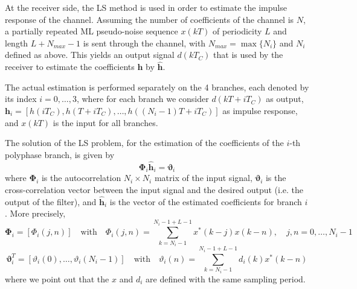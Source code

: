 \documentclass[10pt]{article}
\begin{document}
At the receiver side, the LS method is used in order to estimate the impulse response of the channel. Assuming the number of coefficients of the channel is $N$, a partially repeated ML pseudo-noise sequence $x(kT)$ of periodicity $L$ and length $L + N_{max} - 1$ is sent through the channel, with $N_{max} = \max \{N_i\}$ and $N_i$ defined as above.
This yields an output signal $d(kT_C)$ that is used by the receiver to estimate the coefficients $\mathbf{h}$ by $\mathbf{\hat{h}}$.

The actual estimation is performed separately on the 4 branches, each denoted by its index $i = 0,\ldots,3$, where for each branch we consider $d(kT+iT_C)$ as output, $\mathbf{h}_i = [h(iT_C), h(T+iT_C), \ldots, h((N_i-1)T + iT_C)]$ as impulse response, and $x(kT)$ is the input for all branches.

The solution of the LS problem, for the estimation of the coefficients of the $i$-th polyphase branch, is given by
\begin{equation}
	\mathbf{\Phi}_i \mathbf{\hat{h}}_i = \boldsymbol\vartheta_i
\end{equation}
where $\mathbf{\Phi}_i$ is the autocorrelation $N_i \times N_i$ matrix of the input signal, $ \boldsymbol\vartheta_i$ is the cross-correlation vector between the input signal and the desired output (i.e. the output of the filter), and $\mathbf{\hat{h}}_i$ is the vector of the estimated coefficients for branch $i$. More precisely,
\begin{equation}
	\mathbf{\Phi}_i = [\Phi_i(j,n)] \quad \mathrm{ with } \quad \Phi_i(j,n) = \sum_{k=N_i-1}^{N_i-1+L-1} x^*(k-j)x(k-n), \quad j,n=0,\ldots,N_i-1
\end{equation}
\begin{equation}
	\boldsymbol\vartheta_i ^T = [\vartheta_i(0),\ldots, \vartheta_i(N_i-1)] \quad \mathrm{ with } \quad \vartheta_i(n) = \sum_{k=N_i-1}^{N_i-1+L-1} d_i(k)x^*(k-n)
\end{equation}
where we point out that the $x$ and $d_i$ are defined with the same sampling period.
\end{document}
